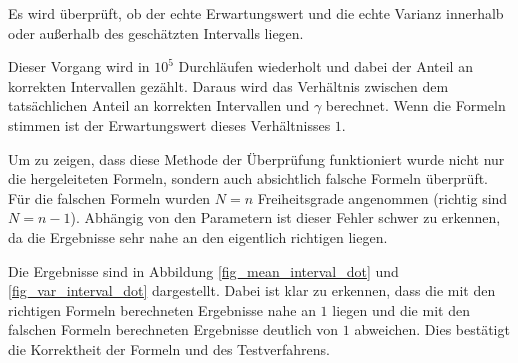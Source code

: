 \documentclass[10pt,twocolumn]{scrartcl}
\begin{document}
		Es wird überprüft, ob der echte Erwartungswert und die echte Varianz innerhalb oder außerhalb des geschätzten Intervalls liegen.

		Dieser Vorgang wird in $10^5$ Durchläufen wiederholt und dabei der Anteil an korrekten Intervallen gezählt. Daraus wird das Verhältnis zwischen dem tatsächlichen Anteil an korrekten Intervallen und $\gamma$ berechnet. Wenn die Formeln stimmen ist der Erwartungswert dieses Verhältnisses $1$.

		Um zu zeigen, dass diese Methode der Überprüfung funktioniert wurde nicht nur die hergeleiteten Formeln, sondern auch absichtlich falsche Formeln überprüft. Für die falschen Formeln wurden $N = n$ Freiheitsgrade angenommen (richtig sind $N = n-1$). Abhängig von den Parametern ist dieser Fehler schwer zu erkennen, da die Ergebnisse sehr nahe an den eigentlich richtigen liegen.

		Die Ergebnisse sind in Abbildung \ref{fig_mean_interval_dot} und \ref{fig_var_interval_dot} dargestellt. Dabei ist klar zu erkennen, dass die mit den richtigen Formeln berechneten Ergebnisse nahe an $1$ liegen und die mit den falschen Formeln berechneten Ergebnisse deutlich von $1$ abweichen. Dies bestätigt die Korrektheit der Formeln und des Testverfahrens.
\end{document}
